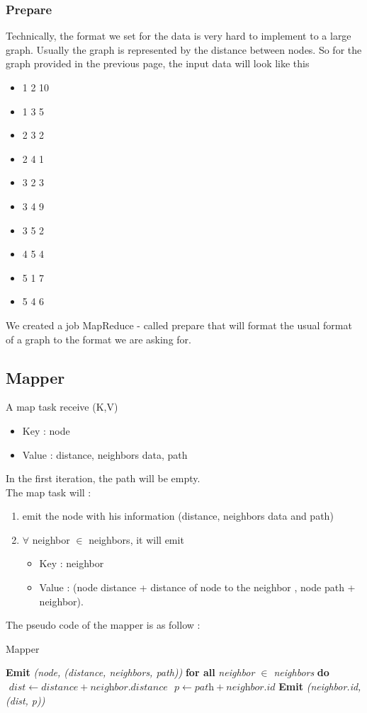 \documentclass[english]{article}
\begin{document}
\subsubsection{Prepare}
Technically, the format we set for the data is very hard to implement to a large graph. Usually the graph is represented by the distance between nodes. So for the graph provided in the previous page, the input data will look like this 
\begin{itemize}
\item 1 2 10
\item 1 3 5
\item 2 3 2
\item 2 4 1
\item 3 2 3
\item 3 4 9
\item 3 5 2
\item 4 5 4
\item 5 1 7
\item 5 4 6
\end{itemize}
We created a job MapReduce - called prepare that will format the usual format of a graph to the format we are asking for.

\newpage
\subsection{Mapper}
A map task receive (K,V)
\begin{itemize}
\item Key : node
\item Value : distance, neighbors data, path
\end{itemize}
In the first iteration, the path will be empty. \\
The map task will : 
\begin{enumerate}
\item emit the node with his information (distance, neighbors data and path)
\item  $\forall$ neighbor $\in$ neighbors, it will emit 
	\begin{itemize}
	\item Key : neighbor
	\item Value : (node distance + distance of node to the neighbor , node path + neighbor).
	\end{itemize}
\end{enumerate}

The pseudo code of the mapper is as follow : 
\begin{algorithm}[h]
\caption{Mapper}\label{mapper}
\begin{algorithmic}[1]
\State \textbf{Emit} \emph{(node, (distance, neighbors, path))}
\State \textbf{for all} \emph{ neighbor $ \in$ neighbors } \textbf{do}
\State $\textit{ dist} \gets \textit{distance} + \textit{neighbor.distance} $
\State $ \textit{ p} \gets \textit{path} + \textit{neighbor.id} $
\State \textbf{ Emit} \emph{(neighbor.id, (dist, p))}
\EndProcedure
\end{algorithmic}
\end{algorithm}
\end{document}
